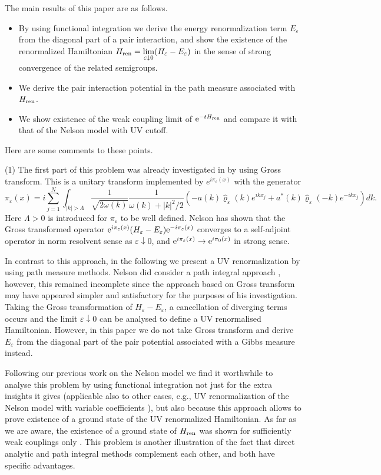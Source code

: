 \documentclass[12pt]{article}
\providecommand{\eq}[1]{\begin{equation}\label{#1}}
\providecommand{\en}{\end{equation}}
\renewcommand{\d}{\displaystyle}
\providecommand{\bi}
{\begin{itemize}}
\providecommand{\ei}{\end{itemize} }
\providecommand{\hni}{\hn_\ren }
\providecommand{\hn}{H}%
\providecommand{\add}{a^\ast}
\providecommand{\La}{{\Lambda}}
\providecommand{\vpe}{{\widehat \varrho_\eps}}
\providecommand{\e}{{\rm e}}
\providecommand{\1}{\mathbb{1}}
\providecommand{\eps}{\varepsilon}
\providecommand{\ren}{{\rm ren}}
\begin{document}
The main results of this paper are as follows.
\bi
\item[(1)]
By using functional integration we derive the energy renormalization term $E_\eps$ from the diagonal part of
a pair interaction, and show the existence of the renormalized Hamiltonian $\d \hn_\ren =\lim_{\eps\downarrow 0}
(\hn_\eps-E_\eps)$ in the sense of strong convergence of the related semigroups.
\item[(2)]
We derive the pair interaction potential in the %
path measure associated with
$\hni$.
\item[(3)]
We show existence of the weak coupling limit  of $\e^{-t\hni}$ and compare it with that of the Nelson model
with UV cutoff.
\ei
Here are some comments to these points.

\medskip
\noindent
(1) The first part of this problem was already investigated in \cite{nel64} by using Gross transform. This
is a unitary transform implemented by
$e^{i\pi_\eps(x)}$ with the generator
\eq{gross}
\pi_\eps(x)=i\sum_{j=1}^N \int_{|k|>\Lambda} \frac{1}{\sqrt{2\omega(k)}}\frac{1}{\omega(k)+|k|^2/2}
(-a(k)\vpe(k)e^{ikx_j}+\add(k)
\vpe(-k)e^{-ikx_j})dk.
\en
Here $\La>0$ is introduced  for $\pi_\eps$ to be well defined. Nelson has shown that the Gross transformed
operator $\e^{i\pi_\eps(x)} (H_\eps-E_\eps) \e^{-i\pi_\eps(x)}$ converges to
a self-adjoint operator in norm
resolvent sense as $\eps\downarrow 0$, and $\e^{i\pi_\eps(x)}\to \e^{i\pi_0(x)}$ in strong sense.

In contrast to this approach, in the following we present a UV renormalization by using path measure methods.
Nelson did consider a path integral approach \cite{nel64b}, however, this remained incomplete since the approach
based on Gross transform may have appeared simpler and satisfactory for the purposes of his investigation.
Taking the Gross transformation of $\hn_\eps-E_\eps$, a cancellation of diverging terms occurs and the limit
$\eps\downarrow 0$ can be analysed to define a UV renormalised Hamiltonian. However, in this paper we do not
take Gross transform and derive $E_\eps$ from the diagonal part of the pair potential associated with a Gibbs
measure instead.

Following our previous work on %
the Nelson model \cite{lms02,bhlms02} we find it worthwhile to
analyse this problem by using functional integration not just for the extra insights it gives (applicable
also to other cases, e.g., UV renormalization of the Nelson model with variable coefficients \cite{ghps12}),
but also because this approach allows to prove existence of a ground state of the UV renormalized Hamiltonian.
As far as we are aware, the existence of a ground state of $H_\ren$ was shown for sufficiently weak couplings
only \cite{hhs05}. This problem is another illustration of the fact that direct analytic and path integral
methods complement each other, and both have specific advantages.
\end{document}
